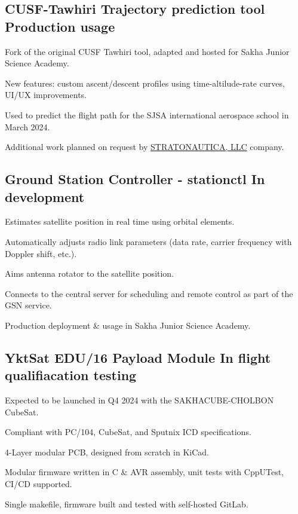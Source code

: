 \documentclass[letter,10pt]{article}
\begin{document}
\subsection{{CUSF-Tawhiri Trajectory prediction tool \hfill Production usage}}
\begin{zitemize}
\item Fork of the original CUSF Tawhiri tool, adapted and hosted for Sakha Junior Science Academy.
\item New features: custom ascent/descent profiles using time-altilude-rate curves, UI/UX improvements.
\item Used to predict the flight path for the SJSA international aerospace school in March 2024.
\item Additional work planned on request by \href{https://stratonautica.ru/}{STRATONAUTICA, LLC} company.
\end{zitemize}

\subsection{{Ground Station Controller - stationctl \hfill In development}}
\begin{zitemize}
\item Estimates satellite position in real time using orbital elements.
\item Automatically adjusts radio link parameters (data rate, carrier frequency with Doppler shift, etc.).
\item Aims antenna rotator to the satellite position.
\item Connects to the central server for scheduling and remote control as part of the GSN service.
\item Production deployment \& usage in Sakha Junior Science Academy.
\end{zitemize}

\subsection{{YktSat EDU/16 Payload Module \hfill In flight qualifiacation testing}}
\begin{zitemize}
\item Expected to be launched in Q4 2024 with the SAKHACUBE-CHOLBON CubeSat.
\item Compliant with PC/104, CubeSat, and Sputnix ICD specifications.
\item 4-Layer modular PCB, designed from scratch in KiCad.
\item Modular firmware written in C \& AVR assembly, unit tests with CppUTest, CI/CD supported.
\item Single makefile, firmware built and tested with self-hosted GitLab.
\end{zitemize}
\end{document}
